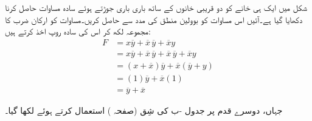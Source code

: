 شکل  میں ایک ہی خانے کو دو قریبی خانوں کے ساتھ باری باری جوڑتے ہوئے سادہ مساوات  حاصل کرنا دکھایا گیا ہے۔آئیں اس مساوات کو بوولین منطق کی مدد سے حاصل کریں۔مساوات کو ارکان ضرب کا مجموعہ لکھ کر اس کی سادہ روپ اخذ کرتے ہیں:
\begin{align*}
F&=x\overline{y}+\overline{x}\,\overline{y}+\overline{x}y\\
&=x\overline{y}+\overline{x}\,\overline{y}+\overline{x}\,\overline{y}+\overline{x}y\\
&=(x+\overline{x})\overline{y}+\overline{x}(\overline{y}+y)\\
&=(1)\overline{y}+\overline{x}(1)\\
&=\overline{y}+\overline{x}
\end{align*}

 جہاں، دوسرے قدم پر جدول -ب کی شِق  (صفحہ ) استعمال کرتے
 ہوئے  لکھا گیا۔

